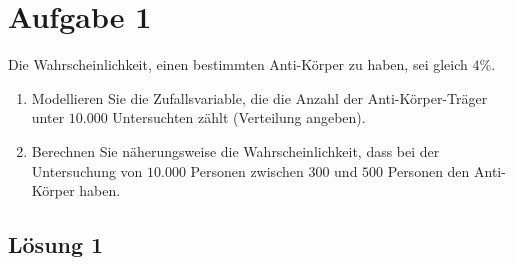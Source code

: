 \documentclass[main.tex]{subfiles}
\begin{document}
\section{Aufgabe 1}
Die Wahrscheinlichkeit, einen bestimmten Anti-Körper zu haben, sei gleich $4\%$.
\begin{enumerate}
\item Modellieren Sie die Zufallsvariable, die die Anzahl der Anti-Körper-Träger unter $10.000$ Untersuchten zählt (Verteilung angeben).
\item Berechnen Sie näherungsweise die Wahrscheinlichkeit, dass bei der Untersuchung von $10.000$ Personen zwischen $300$ und $500$ Personen den Anti-Körper haben.
\end{enumerate}

\subsection{Lösung 1}
\end{document}
